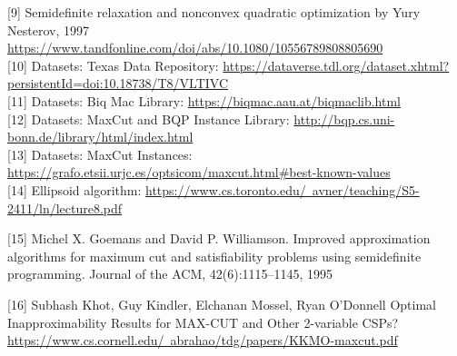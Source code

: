 \documentclass{article}
\begin{document}
[9] Semidefinite relaxation and nonconvex quadratic optimization by Yury Nesterov, 1997
\href{https://www.tandfonline.com/doi/abs/10.1080/10556789808805690}{https://www.tandfonline.com/doi/abs/10.1080/10556789808805690}\\

[10] Datasets: Texas Data Repository:
\href{https://dataverse.tdl.org/dataset.xhtml?persistentId=doi:10.18738/T8/VLTIVC}{https://dataverse.tdl.org/dataset.xhtml?persistentId=doi:10.18738/T8/VLTIVC}\\  

[11] Datasets: Biq Mac Library:
\href{https://biqmac.aau.at/biqmaclib.html}{https://biqmac.aau.at/biqmaclib.html}\\ 

[12] Datasets: MaxCut and BQP Instance Library:
\href{http://bqp.cs.uni-bonn.de/library/html/index.html}{http://bqp.cs.uni-bonn.de/library/html/index.html}\\ 

[13] Datasets: MaxCut Instances:
\href{https://grafo.etsii.urjc.es/optsicom/maxcut.html#best-known-values}{https://grafo.etsii.urjc.es/optsicom/maxcut.html#best-known-values}\\

[14] Ellipsoid algorithm: \href{https://www.cs.toronto.edu/~avner/teaching/S5-2411/ln/lecture8.pdf}{https://www.cs.toronto.edu/~avner/teaching/S5-2411/ln/lecture8.pdf}

[15] Michel X. Goemans and David P. Williamson. Improved approximation algorithms for maximum cut and satisfiability problems using semidefinite programming. Journal of the ACM, 42(6):1115–1145, 1995

[16] Subhash Khot, Guy Kindler, Elchanan Mossel, Ryan O’Donnell Optimal Inapproximability Results for MAX-CUT
and Other 2-variable CSPs?\href{https://www.cs.cornell.edu/~abrahao/tdg/papers/KKMO-maxcut.pdf}{https://www.cs.cornell.edu/~abrahao/tdg/papers/KKMO-maxcut.pdf}
\end{document}
